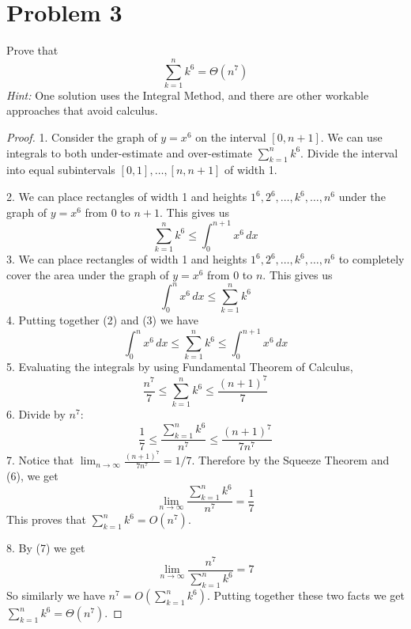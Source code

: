 \documentclass[14pt]{extarticle}
\begin{document}
\section{Problem 3}
Prove that
$$
\sum_{k=1}^n k^6 = \Theta(n^7)
$$
{\it Hint:} One solution uses the Integral Method, and there are other workable approaches that avoid calculus.
\begin{proof}
1. Consider the graph of $y = x^6$ on the interval $[0, n+1]$. We can use integrals to both under-estimate and over-estimate $\sum_{k=1}^n k^6$. Divide the interval into equal subintervals $[0,1], \ldots, [n,n+1]$ of width 1.

2. We can place rectangles of width 1 and heights $1^6, 2^6, \ldots, k^6, \ldots, n^6$ under the graph of $y = x^6$ from $0$ to $n+1$. This gives us
$$
\sum_{k=1}^n k^6 \leq \int_0^{n+1}x^6\,dx
$$
3. We can place rectangles of width 1 and heights $1^6, 2^6, \ldots, k^6, \ldots, n^6$ to completely cover the area under the graph of $y = x^6$ from $0$ to $n$. This gives us
$$
\int_0^{n}x^6\,dx \leq \sum_{k=1}^n k^6
$$
4. Putting together (2) and (3) we have
$$
\int_0^{n}x^6\,dx \leq \sum_{k=1}^n k^6 \leq \int_0^{n+1}x^6\,dx
$$
5. Evaluating the integrals by using Fundamental Theorem of Calculus,
$$
\frac{n^7}{7} \leq \sum_{k=1}^n k^6 \leq \frac{(n+1)^7}{7}
$$
6. Divide by $n^7$:
$$
\frac{1}{7} \leq \frac{\sum_{k=1}^n k^6}{n^7} \leq \frac{(n+1)^7}{7n^7}
$$
7. Notice that $\displaystyle \lim_{n \to \infty} \frac{(n+1)^7}{7n^7} = 1/7$. Therefore by the Squeeze Theorem and (6), we get
$$
\lim_{n \to \infty} \frac{\sum_{k=1}^n k^6}{n^7} = \frac{1}{7}
$$
This proves that $\sum_{k=1}^n k^6 = O(n^7)$.

8. By (7) we get 
$$
\lim_{n \to \infty} \frac{n^7}{\sum_{k=1}^n k^6} = 7
$$
So similarly we have $n^7 = O(\sum_{k=1}^n k^6)$. Putting together these two facts we get $\sum_{k=1}^n k^6 = \Theta(n^7)$.
\end{proof}
\end{document}
